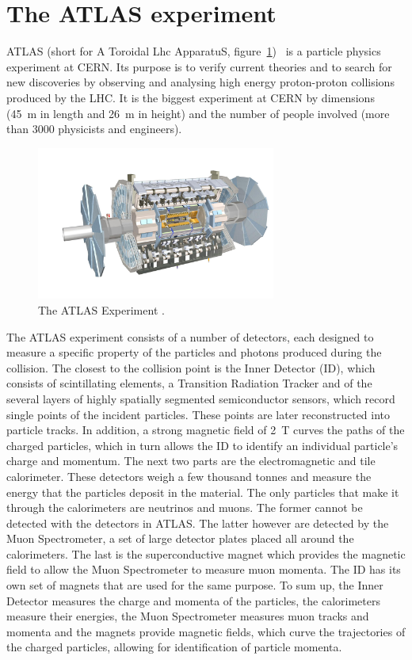 \section{The ATLAS experiment}
ATLAS (short for A Toroidal Lhc ApparatuS, figure~\ref{fig:atlas})~\cite{Jenni:1193085} is a particle physics experiment at CERN. Its purpose is to verify current theories and to search for new discoveries by observing and analysing high energy proton-proton collisions produced by the LHC. It is the biggest experiment at CERN by dimensions (45~m in length and 26~m in height) and the number of people involved (more than 3000 physicists and engineers).
\begin{figure}[!t]
\centering
\includegraphics[width=0.7\textwidth]{01_introduction/pics/atlas3}
\caption{The ATLAS Experiment \cite{Pequenao:1095924}.}
\label{fig:atlas}
\end{figure}
The ATLAS experiment consists of a number of detectors, each designed to measure a specific property of the particles and photons produced during the collision. The closest to the collision point is the Inner Detector (ID), which consists of scintillating elements, a Transition Radiation Tracker and of the several layers of highly spatially segmented semiconductor sensors, which record single points of the incident particles. These points are later reconstructed into particle tracks. In addition, a strong magnetic field of 2~T curves the paths of the charged particles, which in turn allows the ID to identify an individual particle's charge and momentum. The next two parts are the electromagnetic and tile calorimeter. These detectors weigh a few thousand tonnes and measure the energy that the particles deposit in the material. The only particles that make it through the calorimeters are neutrinos and muons. The former cannot be detected with the detectors in ATLAS. The latter however are detected by the Muon Spectrometer, a set of large detector plates placed all around the calorimeters. The last is the superconductive magnet which provides the magnetic field to allow the Muon Spectrometer to measure muon momenta. The ID has its own set of magnets that are used for the same purpose. To sum up, the Inner Detector measures the charge and momenta of the particles, the calorimeters measure their energies, the Muon Spectrometer measures muon tracks and momenta and the magnets provide magnetic fields, which curve the trajectories of the charged particles, allowing for identification of particle momenta.


